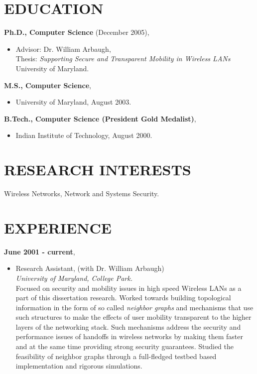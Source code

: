 \begin{resume}
\vspace{0.1in}

\section{EDUCATION}
\vspace{0.1in} 
{\bf Ph.D., Computer Science}  (December 2005),
    \begin{itemize}
         \item[] Advisor: Dr. William Arbaugh, \\
		 Thesis: {\em Supporting Secure and Transparent Mobility in Wireless LANs} \\
                 University of Maryland.
    \end{itemize}

{\bf M.S., Computer Science},   	
    \begin{itemize}
         \item[] University of Maryland, August 2003.
    \end{itemize}

{\bf B.Tech., Computer Science (President Gold Medalist)},
    \begin{itemize}
          \item[] Indian Institute of Technology, August 2000.
    \end{itemize}

 
\section{RESEARCH INTERESTS} 

\vspace{0.1in}
 Wireless Networks, Network and Systems Security.


\section{EXPERIENCE} 
\vspace{0.1in}
 {\bf June 2001 - current},   	
    \begin{itemize}
         \item[] Research Assistant, (with Dr. William Arbaugh)\\
                 {\em University of Maryland, College Park.}\\
		 Focused on security and mobility issues in high speed Wireless LANs as a part of this dissertation research. 
                 Worked towards building topological information in the form
                 of so called {\em neighbor graphs} and mechanisms that use such structures to make the effects 
                 of user mobility transparent to the higher layers of the networking stack. Such mechanisms address
                 the security and performance issues of handoffs in wireless networks by making them faster and at the same time
                 providing strong security guarantees. Studied the feasibility of neighbor graphs through a full-fledged testbed
		 based implementation and rigorous simulations.


\end{itemize}
\end{resume}
